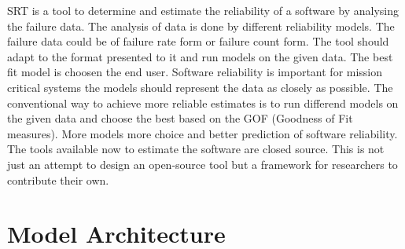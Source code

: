 \documentclass[journal]{IEEEtran}
\begin{document}
SRT is a tool to determine and estimate the reliability of a software by analysing the failure data. The analysis of data is done by different reliability models. The failure data could be of failure rate form or failure count form. The tool should adapt to the format presented to it and run models on the given data. The best fit model is choosen the end user. Software reliability is important for mission critical systems the models should represent the data as closely as possible. The conventional way to achieve more reliable estimates is to run differend models on the given data and choose the best based on the GOF (Goodness of Fit measures). More models more choice and better prediction of software reliability. The tools available now to estimate the software are closed source. This is not just an attempt to design an open-source tool but a framework for researchers to contribute their own.


\section{Model Architecture}



    
\end{document}
